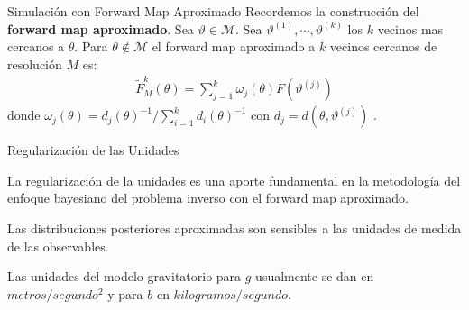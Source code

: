 \documentclass[10pt,aspectratio=169]{beamer}
\begin{document}

  


\begin{frame}{Simulación con Forward Map Aproximado}
  Recordemos la construcción del \textbf{forward map aproximado}. Sea $\vartheta \in \mathcal{M}$. Sea $\vartheta^{(1)},\cdots, \vartheta^{(k)}$ los $k$ vecinos mas cercanos a $\theta$. Para $\theta \notin \mathcal{M}$ el forward map aproximado a $k$ vecinos cercanos de resolución $M$ es:
  \begin{align}
      \tilde{F}^{k}_M(\theta) = \sum_{j = 1}^{k} \omega_j(\theta) F \left(\vartheta^{(j)}\right)
      \label{3.3.01}
  \end{align}
  donde $\omega_j(\theta) = d_j(\theta)^{-1}/ \sum_{i=1}^{k} d_i(\theta)^{-1}$ con $d_j = d(\theta,\vartheta^{(j)})$ .
\end{frame}


\begin{frame}{Regularización de las Unidades}

  La regularización de la unidades es una aporte fundamental en la metodología del enfoque bayesiano del problema inverso con el forward map aproximado.

  \vspace{0.5 cm}

  Las distribuciones posteriores aproximadas son sensibles a las unidades de medida de las observables.

  \vspace{0.5 cm}
  
  Las unidades del modelo gravitatorio para $g$ usualmente se dan en $metros/segundo^2$ y para $b$ en $kilogramos/segundo$.
\end{frame}
\end{document}

